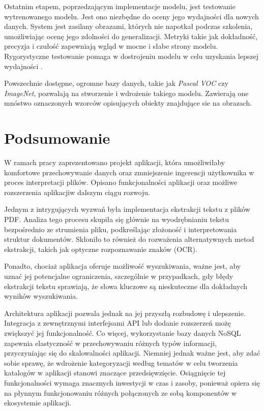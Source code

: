 \documentclass[12pt,a4paper,twoside]{article}
\begin{document}
Ostatnim etapem, poprzedzającym implementacje modelu, jest testowanie wytrenowanego modelu. Jest ono niezbędne do oceny jego wydajności dla nowych danych. System jest zasilany obrazami, których nie napotkał podczas szkolenia, umożliwiając ocenę jego zdolności do generalizacji. Metryki takie jak dokładność, precyzja i czułość zapewniają wgląd w mocne i słabe strony modelu. Rygorystyczne testowanie pomaga w dostrojeniu modelu w celu uzyskania lepszej wydajności \cite{imagg}.\par
Powszechnie dostępne, ogromne bazy danych, takie jak \textit{Pascal VOC} czy \textit{ImageNet}, pozwalają na stworzenie i wdrożenie takiego modelu. Zawierają one mnóstwo oznaczonych wzorców opisujących obiekty znajdujące sie na obrazach. 
\newpage
\section*{Podsumowanie}
W ramach pracy zaprezentowano projekt aplikacji, która umożliwiłaby komfortowe przechowywanie danych oraz zmniejszenie ingerencji użytkownika w proces interpretacji plików. Opisano funkcjonalności aplikacji oraz możliwe rozszerzenia aplikacji\break w dalszym ciągu rozwoju. \par
Jednym z intrygujących wyzwań była implementacja ekstrakcji tekstu z plików PDF. Analiza tego procesu skupiła się głównie na wyodrębnianiu tekstu bezpośrednio ze strumienia pliku, podkreślając złożoność i interpretowania struktur dokumentów. Skłoniło to również do rozważenia alternatywnych metod ekstrakcji, takich jak optyczne rozpoznawanie znaków (OCR). \par
Ponadto, chociaż aplikacja oferuje możliwość wyszukiwania, ważne jest, aby uznać jej potencjalne ograniczenia, szczególnie w przypadkach, gdy błędy ekstrakcji tekstu sprawiają, że słowa kluczowe są nieskuteczne dla dokładnych wyników wyszukiwania.\par
Architektura aplikacji pozwala jednak na jej przyszłą rozbudowę i ulepszenie. Integracja z zewnętrznymi interfejsami API lub dodanie rozszerzeń możę zwiększyć jej funkcjonalność. Co więcej, wykorzystanie bazy danych NoSQL zapewnia elastyczność w przechowywaniu różnych typów informacji, przyczyniając się do skalowalności aplikacji. Niemniej jednak ważne jest, aby zdać sobie sprawę, że wdrożenie kategoryzacji według tematów w celu tworzenia katalogów w aplikacji stanowi znaczące przedsięwzięcie. Osiągnięcie tej funkcjonalności wymaga znacznych inwestycji w czas i zasoby, ponieważ opiera się na płynnym funkcjonowaniu różnych połączonych ze sobą komponentów w ekosystemie aplikacji.
\newpage
\listoffigures
{}
\newpage
{}


\end{document}
